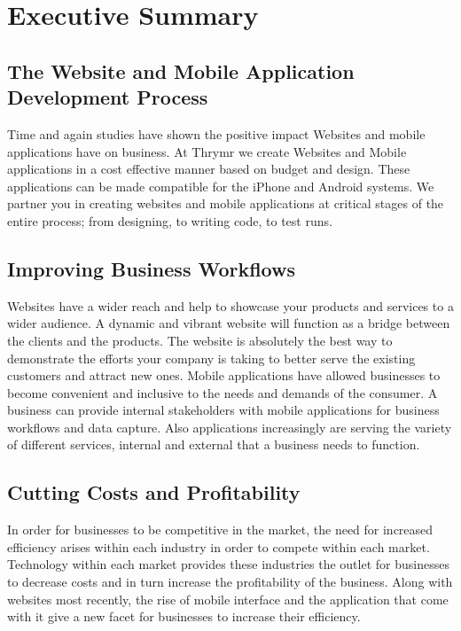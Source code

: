 \documentclass[a4paper]{article}
\begin{document}
	
	\newpage
	
	\linespread{1.3}
	
	\newcommand\BackgroundPic{
		\put(-3,-0.5){
			\parbox[b][\paperwidth]{\paperheight }{%
				\vfill
				{\transparent{0.4} \texttt{[image: Pagelayout1.jpg]}}%
				\vfill
			}}
			\put(0,4){%
				\transparent{0.4}\textcolor{white}{\rule{\paperwidth}{\paperheight}}
			}
			}
			
	\AddToShipoutPicture{\BackgroundPic}		
	\sectionfont{\color{levelfirst}}
	\section{Executive Summary}
	
	\subsectionfont{\color{levelfirst}}
	\subsection{The Website and Mobile Application Development Process}
	Time and again studies have shown the positive impact Websites and mobile applications have on business. At Thrymr we create Websites and Mobile applications in a cost effective manner based on budget and design. These applications can be made compatible for the iPhone and Android systems. We partner you in creating websites and mobile applications at critical stages of the entire process; from designing, to writing code, to test runs.
	
	\subsection{Improving Business Workflows} %
	Websites have a wider reach and help to showcase your products and services to a wider audience.  A dynamic and vibrant website will function as a bridge between the clients and the products. The website is absolutely the best way to demonstrate the efforts your company is taking to better serve the existing customers and attract new ones.
	Mobile applications have allowed businesses to become convenient and inclusive to the needs and demands of the consumer. A business can provide internal stakeholders with mobile applications for business workflows and data capture. Also applications increasingly are serving the variety of different services, internal and external that a business needs to function.
	
	\subsection{Cutting Costs and Profitability}
	In order for businesses to be competitive in the market, the need for increased efficiency arises within each industry in order to compete within each market. Technology within each market provides these industries the outlet for businesses to decrease costs and in turn increase the profitability of the business. Along with websites most recently, the rise of mobile interface and the application that come with it give a new facet for businesses to increase their efficiency.
	
\end{document}
